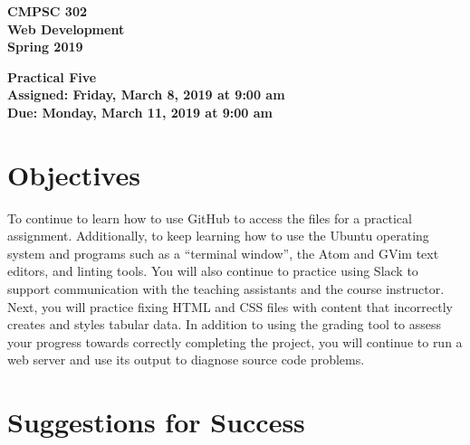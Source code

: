 \documentclass[11pt]{article}
\newcommand{\assignmentduedate}{March 11}
\newcommand{\assignmentassignedate}{March 8}
\newcommand{\assignmentnumber}{Five}
\newcommand{\labyear}{2019}
\newcommand{\labdueday}{Monday}
\newcommand{\labassignday}{Friday}
\newcommand{\labtime}{9:00 am}
\newcommand{\assigneddate}{Assigned: \labassignday, \assignmentassignedate, \labyear{} at \labtime{}}
\newcommand{\duedate}{Due: \labdueday, \assignmentduedate, \labyear{} at \labtime{}}
\newcommand{\labtitle}[1]
{
  \begin{center}
    \begin{center}
      \bf
      CMPSC 302\\Web Development\\
      Spring 2019\\
      \medskip
    \end{center}
    \bf
    #1
  \end{center}
}
\begin{document}
\thispagestyle{empty}

\labtitle{Practical \assignmentnumber{} \\ \assigneddate{} \\ \duedate{}}

\section*{Objectives}

To continue to learn how to use GitHub to access the files for a practical
assignment. Additionally, to keep learning how to use the Ubuntu operating
system and programs such as a ``terminal window'', the Atom and GVim text
editors, and linting tools. You will also continue to practice using Slack to
support communication with the teaching assistants and the course instructor.
Next, you will practice fixing HTML and CSS files with content that incorrectly
creates and styles tabular data. In addition to using the grading tool to assess
your progress towards correctly completing the project, you will continue to run
a web server and use its output to diagnose source code problems.

\section*{Suggestions for Success}
\end{document}
